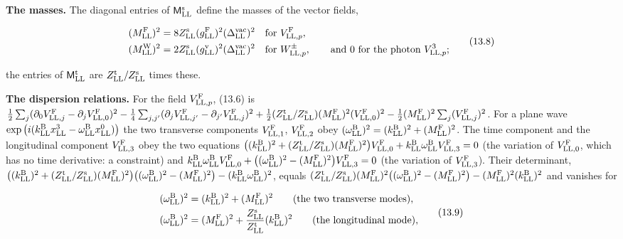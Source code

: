 \documentclass[
  10pt,
]{article}
\begin{document}
\textbf{The masses.} The diagonal entries of
\(\mathsf M^{\rm s}_{\rm LL}\) define the masses of the vector fields,

\[\begin{aligned}(M^{\rm F}_{\rm LL})^2&=8Z^{\rm s}_{\rm LL}(g^{\rm F}_{\rm LL})^2(\Delta^{\rm vac}_{\rm LL})^2\quad\text{for }V^{\rm F}_{{\rm LL},p},\\(M^{\rm W}_{\rm LL})^2&=2Z^{\rm s}_{\rm LL}(g^{\rm v}_{\rm LL})^2(\Delta^{\rm vac}_{\rm LL})^2\quad\text{for }W^\pm_{{\rm LL},p},\qquad\text{and 0 for the photon }V^3_{{\rm LL},p};\end{aligned}\tag{13.8}\]

the entries of \(\mathsf M^{\rm t}_{\rm LL}\) are
\(Z^{\rm t}_{\rm LL}/Z^{\rm s}_{\rm LL}\) times these.

\textbf{The dispersion relations.} For the field
\(V^{\rm F}_{{\rm LL},p}\), (13.6) is
\(\tfrac12\sum_j(\partial_0V^{\rm F}_{{\rm LL},j}-\partial_jV^{\rm F}_{{\rm LL},0})^2-\tfrac14\sum_{j,j'}(\partial_jV^{\rm F}_{{\rm LL},j'}-\partial_{j'}V^{\rm F}_{{\rm LL},j})^2+\tfrac12(Z^{\rm t}_{\rm LL}/Z^{\rm s}_{\rm LL})(M^{\rm F}_{\rm LL})^2(V^{\rm F}_{{\rm LL},0})^2-\tfrac12(M^{\rm F}_{\rm LL})^2\sum_j(V^{\rm F}_{{\rm LL},j})^2\).
For a plane wave
\(\exp\big(i(k^{\rm B}_{\rm LL}x^3_{\rm LL}-\omega^{\rm B}_{\rm LL}x^0_{\rm LL})\big)\)
the two transverse components \(V^{\rm F}_{{\rm LL},1}\),
\(V^{\rm F}_{{\rm LL},2}\) obey
\((\omega^{\rm B}_{\rm LL})^2=(k^{\rm B}_{\rm LL})^2+(M^{\rm F}_{\rm LL})^2\).
The time component and the longitudinal component
\(V^{\rm F}_{{\rm LL},3}\) obey the two equations
\(\big((k^{\rm B}_{\rm LL})^2+(Z^{\rm t}_{\rm LL}/Z^{\rm s}_{\rm LL})(M^{\rm F}_{\rm LL})^2\big)V^{\rm F}_{{\rm LL},0}+k^{\rm B}_{\rm LL}\omega^{\rm B}_{\rm LL}V^{\rm F}_{{\rm LL},3}=0\)
(the variation of \(V^{\rm F}_{{\rm LL},0}\), which has no time
derivative: a constraint) and
\(k^{\rm B}_{\rm LL}\omega^{\rm B}_{\rm LL}V^{\rm F}_{{\rm LL},0}+\big((\omega^{\rm B}_{\rm LL})^2-(M^{\rm F}_{\rm LL})^2\big)V^{\rm F}_{{\rm LL},3}=0\)
(the variation of \(V^{\rm F}_{{\rm LL},3}\)). Their determinant,
\(\big((k^{\rm B}_{\rm LL})^2+(Z^{\rm t}_{\rm LL}/Z^{\rm s}_{\rm LL})(M^{\rm F}_{\rm LL})^2\big)\big((\omega^{\rm B}_{\rm LL})^2-(M^{\rm F}_{\rm LL})^2\big)-(k^{\rm B}_{\rm LL}\omega^{\rm B}_{\rm LL})^2\),
equals
\((Z^{\rm t}_{\rm LL}/Z^{\rm s}_{\rm LL})(M^{\rm F}_{\rm LL})^2\big((\omega^{\rm B}_{\rm LL})^2-(M^{\rm F}_{\rm LL})^2\big)-(M^{\rm F}_{\rm LL})^2(k^{\rm B}_{\rm LL})^2\)
and vanishes for

\[\begin{aligned}(\omega^{\rm B}_{\rm LL})^2&=(k^{\rm B}_{\rm LL})^2+(M^{\rm F}_{\rm LL})^2\qquad\text{(the two transverse modes)},\\(\omega^{\rm B}_{\rm LL})^2&=(M^{\rm F}_{\rm LL})^2+\frac{Z^{\rm s}_{\rm LL}}{Z^{\rm t}_{\rm LL}}(k^{\rm B}_{\rm LL})^2\qquad\text{(the longitudinal mode)},\end{aligned}\tag{13.9}\]
\end{document}
